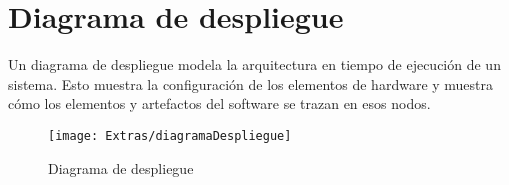 \section{Diagrama de despliegue}
Un diagrama de despliegue modela la arquitectura en tiempo de ejecución de un sistema. Esto muestra la configuración de los elementos de hardware y muestra cómo los elementos y artefactos del software se trazan en esos nodos.
\begin{figure}[H]
		\centering
		\texttt{[image: Extras/diagramaDespliegue]}
		\caption{Diagrama de despliegue}
	\label{fig:diagramaDespliegue}
	\end{figure}